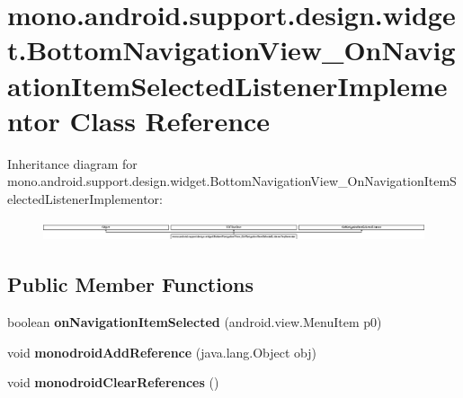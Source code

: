 \hypertarget{classmono_1_1android_1_1support_1_1design_1_1widget_1_1_bottom_navigation_view___on_navigation_ie9d71c6c186664ed279b77f9f21d9a3f}{}\section{mono.\+android.\+support.\+design.\+widget.\+Bottom\+Navigation\+View\+\_\+\+On\+Navigation\+Item\+Selected\+Listener\+Implementor Class Reference}
\label{classmono_1_1android_1_1support_1_1design_1_1widget_1_1_bottom_navigation_view___on_navigation_ie9d71c6c186664ed279b77f9f21d9a3f}
Inheritance diagram for mono.\+android.\+support.\+design.\+widget.\+Bottom\+Navigation\+View\+\_\+\+On\+Navigation\+Item\+Selected\+Listener\+Implementor\+:\begin{figure}[H]
\begin{center}
\leavevmode
\includegraphics[height=0.602151cm]{classmono_1_1android_1_1support_1_1design_1_1widget_1_1_bottom_navigation_view___on_navigation_ie9d71c6c186664ed279b77f9f21d9a3f}
\end{center}
\end{figure}
\subsection*{Public Member Functions}
\begin{DoxyCompactItemize}
\item 
\mbox{\label{classmono_1_1android_1_1support_1_1design_1_1widget_1_1_bottom_navigation_view___on_navigation_ie9d71c6c186664ed279b77f9f21d9a3f_a1bb6dccbb265a04710376bed48b9e13c}} 
boolean {\bfseries on\+Navigation\+Item\+Selected} (android.\+view.\+Menu\+Item p0)
\item 
\mbox{\label{classmono_1_1android_1_1support_1_1design_1_1widget_1_1_bottom_navigation_view___on_navigation_ie9d71c6c186664ed279b77f9f21d9a3f_a4c533149ea1e06bd26cd4f6181e94ba9}} 
void {\bfseries monodroid\+Add\+Reference} (java.\+lang.\+Object obj)
\item 
\mbox{\label{classmono_1_1android_1_1support_1_1design_1_1widget_1_1_bottom_navigation_view___on_navigation_ie9d71c6c186664ed279b77f9f21d9a3f_ac1245e1801119e2aa7ab0c353ab2a6d9}} 
void {\bfseries monodroid\+Clear\+References} ()
\end{DoxyCompactItemize}
